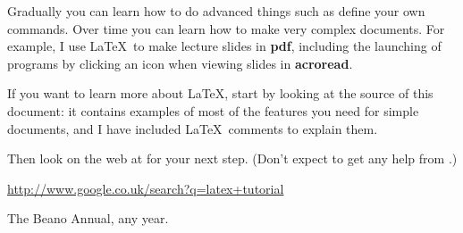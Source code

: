 \documentclass[12pt,a4paper]{article}
\begin{document}
Gradually you can learn how to do advanced things such as define your own
commands. Over time you can learn how to make very complex documents. For
example, I use \LaTeX\ to make lecture slides in \textbf{pdf}, including the
launching of programs by clicking an icon when viewing slides in
\textbf{acroread}.

If you want to learn more about \LaTeX, start by looking at the source of this
document: it contains examples of most of the features you need for simple
documents, and I have included \LaTeX\ comments to explain them.


Then look on the web at \cite{software-url} for your next step. (Don't expect
to get any help from \cite{beano}.)


\begin{thebibliography}{99}


\url{http://www.google.co.uk/search?q=latex+tutorial}

The Beano Annual, any year.

\end{thebibliography}

\end{document}
